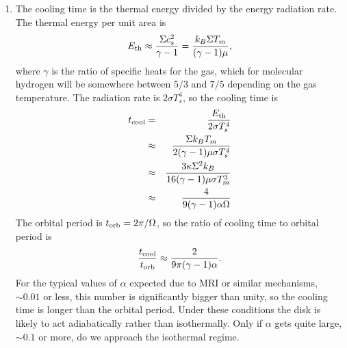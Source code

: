 \begin{enumerate}
\begin{enumerate}
\item The cooling time is the thermal energy divided by the energy radiation rate. The thermal energy per unit area is
\begin{displaymath}
E_{\rm th} \approx \frac{\Sigma c_s^2}{\gamma-1} = \frac{k_B \Sigma T_m}{(\gamma-1)\mu},
\end{displaymath}
where $\gamma$ is the ratio of specific heats for the gas, which for molecular hydrogen will be somewhere between $5/3$ and $7/5$ depending on the gas temperature. The radiation rate is $2\sigma T_s^4$, so the cooling time is
\begin{eqnarray*}
t_{\rm cool} & = & \frac{E_{\rm th}}{2\sigma T_s^4} \\
& \approx & \frac{\Sigma k_B T_m}{2(\gamma-1)\mu \sigma T_s^4} \\
& \approx & \frac{3 \kappa \Sigma^2 k_B}{16(\gamma-1)\mu \sigma T_m^3} \\
& \approx & \frac{4}{9 (\gamma-1) \alpha \Omega}
\end{eqnarray*}
The orbital period is $t_{\rm orb} = 2\pi/\Omega$, so the ratio of cooling time to orbital period is
\begin{displaymath}
\frac{t_{\rm cool}}{t_{\rm orb}} \approx \frac{2}{9\pi(\gamma-1)\alpha}.
\end{displaymath}
For the typical values of $\alpha$ expected due to MRI or similar mechanisms, $\sim 0.01$ or less, this number is significantly bigger than unity, so the cooling time is longer than the orbital period. Under these conditions the disk is likely to act adiabatically rather than isothermally. Only if $\alpha$ gets quite large, $\sim 0.1$ or more, do we approach the isothermal regime.


\end{enumerate}
\end{enumerate}
